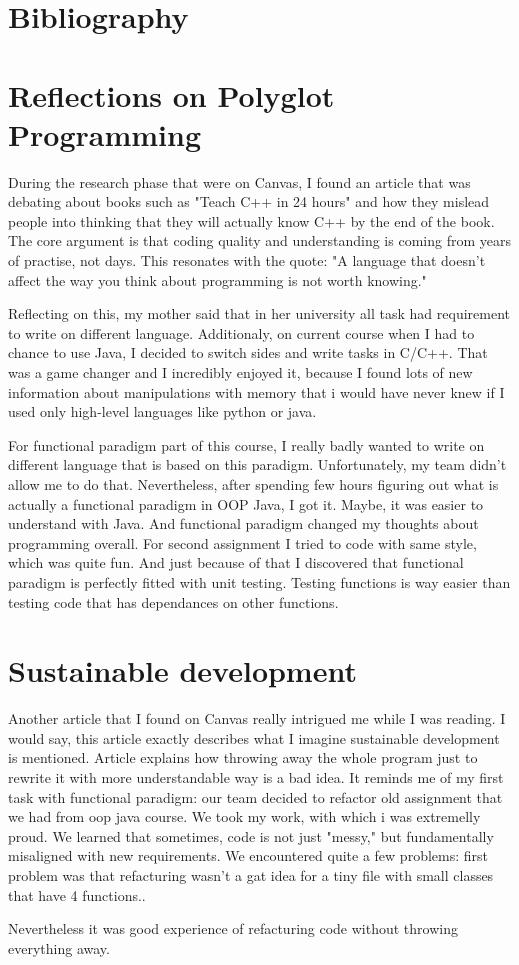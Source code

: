 \documentclass{article}
\begin{document}
\section{Bibliography}
\printbibliography[heading=none]

\newpage
\appendix
\section{Reflections on Polyglot Programming}
\label{appendix:languages}
During the research phase that were on Canvas, I found an article \cite{a2025_teach} that was debating about books such as "Teach C++ in 24 hours" and how they mislead people into thinking that they will actually know C++ by the end of the book. The core argument is that coding quality and understanding is coming from years of practise, not days. This resonates with the quote: "A language that doesn't affect the way you think about programming is not worth knowing."

Reflecting on this, my mother said that in her university all task had requirement to write on different language. Additionaly, on current course when I had to chance to use Java, I decided to switch sides and write tasks in C/C++. That was a game changer and I incredibly enjoyed it, because I found lots of new information about manipulations with memory that i would have never knew if I used only high-level languages like python or java.

For functional paradigm part of this course, I really badly wanted to write on different language that is based  on this paradigm. Unfortunately, my team didn't allow me to do that. Nevertheless, after spending few hours figuring out what is actually a functional paradigm in OOP Java, I got it. Maybe, it was easier to understand with Java. And functional paradigm changed my thoughts about programming overall. For second assignment I tried to code with same style, which was quite fun. And just because of that I discovered that functional paradigm is perfectly fitted with unit testing. Testing functions is way easier than testing code that has dependances on other functions.

\section{Sustainable development}
\label{appendix:sustainable}

Another article \cite{spolsky_2000_things} that I found on Canvas really intrigued me while I was reading. I would say, this article exactly describes what I imagine sustainable development is mentioned. Article explains how throwing away the whole program just to rewrite it with more understandable way is a bad idea. It reminds me of my first task with functional paradigm: our team decided to refactor old assignment that we had from oop java course. We took my work, with which i was extremelly proud. We learned that sometimes, code is not just "messy," but fundamentally misaligned with new requirements. We encountered quite a few problems: first problem was that refacturing wasn't a gat idea for a tiny file with small classes that have 4 functions..

Nevertheless it was good experience of refacturing code without throwing everything away. 
\end{document}
